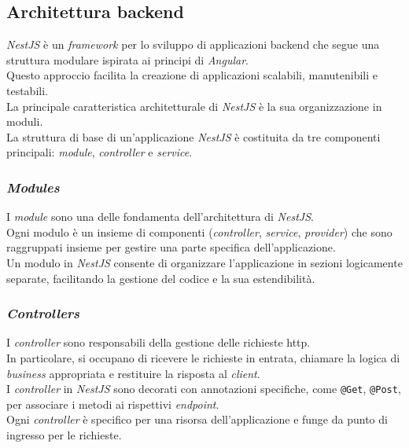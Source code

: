 \subsection*{Architettura \gls{backend}}

\textit{NestJS} è un \textit{framework} per lo sviluppo di applicazioni \gls{backend} che segue una struttura modulare ispirata ai principi di \textit{Angular}. \\
Questo approccio facilita la creazione di applicazioni scalabili, manutenibili e testabili.\\

\noindent La principale caratteristica architetturale di \textit{NestJS} è la sua organizzazione in moduli. \\
La struttura di base di un'applicazione \textit{NestJS} è costituita da tre componenti principali: \textit{module}, \textit{controller} e \textit{service}. 

\subsubsection{\textit{Modules}}
I \textit{module} sono una delle fondamenta dell'architettura di \textit{NestJS}.\\
Ogni modulo è un insieme di componenti (\textit{controller}, \textit{service}, \textit{provider}) che sono raggruppati insieme per gestire una parte specifica dell'applicazione.\\
Un modulo in \textit{NestJS} consente di organizzare l'applicazione in sezioni logicamente separate, facilitando la gestione del codice e la sua estendibilità.

\subsubsection{\textit{Controllers}}
I \textit{controller} sono responsabili della gestione delle richieste \gls{http}.\\
In particolare, si occupano di ricevere le richieste in entrata, chiamare la logica di \textit{business} appropriata e restituire la risposta al \textit{client}.\\
I \textit{controller} in \textit{NestJS} sono decorati con annotazioni specifiche, come \texttt{@Get}, \texttt{@Post}, per associare i metodi ai rispettivi \textit{endpoint}.\\
Ogni \textit{controller} è specifico per una risorsa dell'applicazione e funge da punto di ingresso per le richieste.

